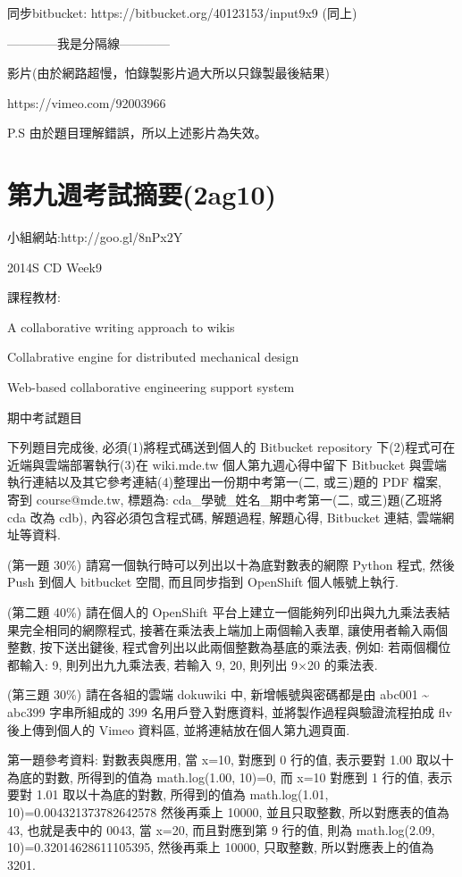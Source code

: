 \documentclass[]{article}
\begin{document}
同步bitbucket: https://bitbucket.org/40123153/input9x9 (同上)

------------我是分隔線------------

影片(由於網路超慢，怕錄製影片過大所以只錄製最後結果)

https://vimeo.com/92003966

P.S 由於題目理解錯誤，所以上述影片為失效。

\section{第九週考試摘要(2ag10)}\label{ux7b2cux4e5dux9031ux8003ux8a66ux6458ux89812ag10}

小組網站:http://goo.gl/8nPx2Y

2014S CD Week9

課程教材:

A collaborative writing approach to wikis

Collabrative engine for distributed mechanical design

Web-based collaborative engineering support system

期中考試題目

下列題目完成後, 必須(1)將程式碼送到個人的 Bitbucket repository
下(2)程式可在近端與雲端部署執行(3)在 wiki.mde.tw 個人第九週心得中留下
Bitbucket 與雲端執行連結以及其它參考連結(4)整理出一份期中考第一(二,
或三)題的 PDF 檔案, 寄到 course@mde.tw, 標題為:
cda\_學號\_姓名\_期中考第一(二, 或三)題(乙班將 cda 改為 cdb),
內容必須包含程式碼, 解題過程, 解題心得, Bitbucket 連結, 雲端網址等資料.

(第一題 30\%) 請寫一個執行時可以列出以十為底對數表的網際 Python 程式,
然後 Push 到個人 bitbucket 空間, 而且同步指到 OpenShift 個人帳號上執行.

(第二題 40\%) 請在個人的 OpenShift
平台上建立一個能夠列印出與九九乘法表結果完全相同的網際程式,
接著在乘法表上端加上兩個輸入表單, 讓使用者輸入兩個整數, 按下送出鍵後,
程式會列出以此兩個整數為基底的乘法表, 例如: 若兩個欄位都輸入: 9,
則列出九九乘法表, 若輸入 9, 20, 則列出 9×20 的乘法表.

(第三題 30\%) 請在各組的雲端 dokuwiki 中, 新增帳號與密碼都是由 abc001
\textasciitilde{} abc399 字串所組成的 399 名用戶登入對應資料,
並將製作過程與驗證流程拍成 flv 後上傳到個人的 Vimeo 資料區,
並將連結放在個人第九週頁面.

第一題參考資料: 對數表與應用, 當 x=10, 對應到 0 行的值, 表示要對 1.00
取以十為底的對數, 所得到的值為 math.log(1.00, 10)=0, 而 x=10 對應到 1
行的值, 表示要對 1.01 取以十為底的對數, 所得到的值為 math.log(1.01,
10)=0.004321373782642578 然後再乘上 10000, 並且只取整數,
所以對應表的值為 43, 也就是表中的 0043, 當 x=20, 而且對應到第 9 行的值,
則為 math.log(2.09, 10)=0.32014628611105395, 然後再乘上 10000, 只取整數,
所以對應表上的值為 3201.
\end{document}
